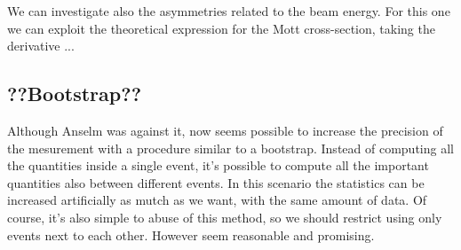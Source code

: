 We can investigate also the asymmetries related to the beam energy. For this one we can exploit the theoretical expression for the Mott cross-section, taking the derivative ...

\subsection{??Bootstrap??}

Although Anselm was against it, now seems possible to increase the precision of the mesurement with a procedure similar to a bootstrap. Instead of computing all the quantities inside a single event, it's possible to compute all the important quantities also between different events. In this scenario the statistics can be increased artificially as mutch as we want, with the same amount of data. Of course, it's also simple to abuse of this method, so we should restrict using only events next to each other. However seem reasonable and promising.




